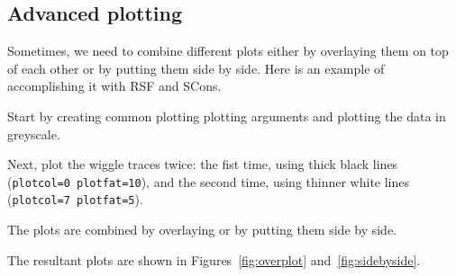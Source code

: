 
\subsection{Advanced plotting}

Sometimes, we need to combine different plots either by overlaying
them on top of each other or by putting them side by side. Here is an
example of accomplishing it with RSF and SCons.

Start by creating common plotting plotting arguments and plotting the
data in greyscale. 



Next, plot the wiggle traces twice: the fist time, using thick black
lines (\texttt{plotcol=0 plotfat=10}), and the second time, using
thinner white lines (\texttt{plotcol=7 plotfat=5}).



The plots are combined by overlaying or by putting them side by side.



The resultant plots are shown in Figures~\ref{fig:overplot} and~\ref{fig:sidebyside}. 



\begin{comment}
Running \texttt{scons -Q overplot.view} produces 
\begin{verbatim}
< windowed.rsf /path/to/RSF/bin/sfgrey wheretitle=t wherexlabel=b transp=y poly=y yreverse=y pclip=100 nc=100 allpos=n min1=.4 max1=.8 max2=1. min2=.05 poly=n > grey.vpl
< windowed.rsf /path/to/RSF/bin/sfwiggle plotcol=0 plotfat=10 transp=y poly=y yreverse=y pclip=100 nc=100 allpos=n min1=.4 max1=.8 max2=1. min2=.05 poly=n > wiggle1.vpl
< windowed.rsf /path/to/RSF/bin/sfwiggle plotcol=7 plotfat=3 transp=y poly=y yreverse=y pclip=100 nc=100 allpos=n min1=.4 max1=.8 max2=1. min2=.05 poly=n > wiggle2.vpl
/path/to/RSF/bin/vppen erase=o vpstyle=n grey.vpl wiggle1.vpl wiggle2.vpl > Fig/overplot.vpl
/path/to/RSF/bin/xtpen Fig/overplot.vpl
\end{verbatim}
\end{comment}

